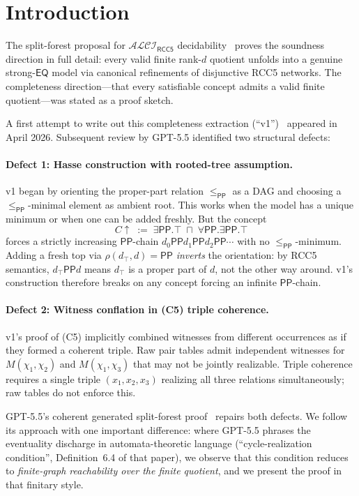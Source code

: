 \documentclass[11pt]{article}
\theoremstyle{definition}
\theoremstyle{remark}
\newcommand{\PP}{\mathsf{PP}}
\newcommand{\EQ}{\mathsf{EQ}}
\newcommand{\ALCIRCC}[1]{\mathcal{ALCI}_{\mathsf{RCC#1}}}
\begin{document}
\section{Introduction}
\label{sec:intro}

The split-forest proposal for $\ALCIRCC{5}$
decidability~\cite{SplitForest} proves the soundness direction in
full detail: every valid finite rank-$d$ quotient unfolds into a
genuine strong-$\EQ$ model via canonical refinements of disjunctive
RCC5 networks.  The completeness direction---that every satisfiable
concept admits a valid finite quotient---was stated as a proof
sketch.

A first attempt to write out this completeness extraction
(``v1'')~\cite{CompletenessV1} appeared in April 2026.  Subsequent
review by GPT-5.5 identified two structural defects:

\paragraph{Defect 1: Hasse construction with rooted-tree assumption.}
v1 began by orienting the proper-part relation $\le_{\PP}$ as a DAG
and choosing a $\le_{\PP}$-minimal element as ambient root.  This
works when the model has a unique minimum or when one can be added
freshly.  But the concept
\[
C\!\uparrow \;:=\; \exists\PP.\top \;\sqcap\; \forall\PP.\exists\PP.\top
\]
forces a strictly increasing $\PP$-chain $d_0\PP d_1\PP d_2\PP\cdots$
with no $\le_{\PP}$-minimum.  Adding a fresh top via
$\rho(d_\top,d)=\PP$ \emph{inverts} the orientation: by RCC5
semantics, $d_\top\PP d$ means $d_\top$ is a proper part of $d$, not
the other way around.  v1's construction therefore breaks on any
concept forcing an infinite $\PP$-chain.

\paragraph{Defect 2: Witness conflation in (C5) triple coherence.}
v1's proof of (C5) implicitly combined witnesses from different
occurrences as if they formed a coherent triple.  Raw pair tables
admit independent witnesses for $M(\chi_1,\chi_2)$ and
$M(\chi_1,\chi_3)$ that may not be jointly realizable.  Triple
coherence requires a single triple $(x_1,x_2,x_3)$ realizing all
three relations simultaneously; raw tables do not enforce this.

\medskip
GPT-5.5's coherent generated split-forest
proof~\cite{GPT55Generated} repairs both defects.  We follow its
approach with one important difference: where GPT-5.5 phrases the
eventuality discharge in automata-theoretic language
(``cycle-realization condition'', Definition~6.4 of that paper),
we observe that this condition reduces to \emph{finite-graph
reachability over the finite quotient}, and we present the proof
in that finitary style.
\end{document}
